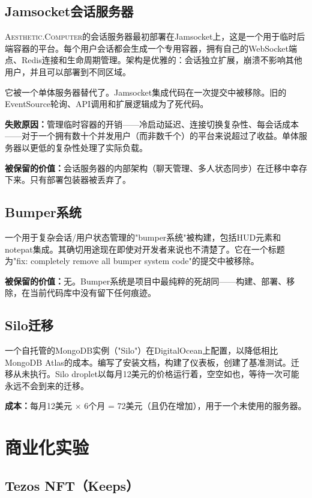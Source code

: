 \documentclass[10pt,letterpaper,twocolumn]{article}
\newcommand{\ac}{\textsc{Aesthetic.Computer}}
\begin{document}
\subsection{Jamsocket会话服务器}

\ac{}的会话服务器最初部署在Jamsocket上，这是一个用于临时后端容器的平台。每个用户会话都会生成一个专用容器，拥有自己的WebSocket端点、Redis连接和生命周期管理。架构是优雅的：会话独立扩展，崩溃不影响其他用户，并且可以部署到不同区域。

它被一个单体服务器替代了。Jamsocket集成代码在一次提交中被移除。旧的EventSource轮询、API调用和扩展逻辑成为了死代码。

\textbf{失败原因：}管理临时容器的开销——冷启动延迟、连接切换复杂性、每会话成本——对于一个拥有数十个并发用户（而非数千个）的平台来说超过了收益。单体服务器以更低的复杂性处理了实际负载。

\textbf{被保留的价值：}会话服务器的内部架构（聊天管理、多人状态同步）在迁移中幸存下来。只有部署包装器被丢弃了。

\subsection{Bumper系统}

一个用于复杂会话/用户状态管理的"bumper系统"被构建，包括HUD元素和notepat集成。其确切用途现在即使对开发者来说也不清楚了。它在一个标题为"fix: completely remove all bumper system code"的提交中被移除。

\textbf{被保留的价值：}无。Bumper系统是项目中最纯粹的死胡同——构建、部署、移除，在当前代码库中没有留下任何痕迹。

\subsection{Silo迁移}

一个自托管的MongoDB实例（"Silo"）在DigitalOcean上配置，以降低相比MongoDB Atlas的成本。编写了安装文档，构建了仪表板，创建了基准测试。迁移从未执行。Silo droplet以每月12美元的价格运行着，空空如也，等待一次可能永远不会到来的迁移。

\textbf{成本：}每月12美元 $\times$ 6个月 = 72美元（且仍在增加），用于一个未使用的服务器。

\section{商业化实验}

\subsection{Tezos NFT（Keeps）}
\end{document}
